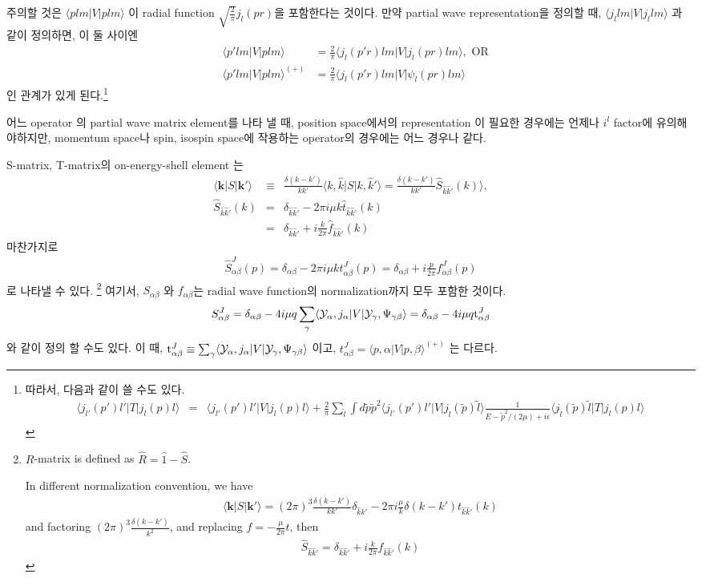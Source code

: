 \documentclass[10pt]{book}
\def\bm{\boldsymbol}
\newcommand{\bea}{\begin{eqnarray}}
\newcommand{\eea}{\end{eqnarray}}
\newcommand{\no}{\nonumber \\}
\def\vk{{\bm k}}
\def\la{\langle}
\def\ra{\rangle}
\begin{document}
\begin{itemize}
주의할 것은 $\la plm|V|plm\ra$ 이 radial function
$\sqrt{\frac{2}{\pi}}j_l(pr)$을 포함한다는 것이다. 만약 partial
wave representation을 정의할 때, $\la j_l lm|V|j_l lm\ra$
과 같이 정의하면, 이 둘 사이엔
\bea
&\la p'lm|V|plm\ra &=\frac{2}{\pi}\la j_l(p'r) lm|V|j_l(pr) lm\ra,\mbox{ OR}\no
&\la p'lm|V|plm\ra^{(+)} &=\frac{2}{\pi}\la j_l(p'r) lm|V|\psi_l(pr) lm\ra
\eea 
인 관계가 있게 된다.\footnote{
따라서, 다음과 같이 쓸 수도 있다.
\bea
\la j_{l'}(p') l'| T| j_{l}(p) l\ra
&=&\la j_{l'}(p') l'| V| j_{l}(p) l\ra
+\frac{2}{\pi}\sum_{\tilde{l}}\int d\tilde{p}\tilde{p}^2
 \la j_{l'}(p') l'| V| j_{\tilde{l}}(\tilde{p}) \tilde{l}\ra
\frac{1}{E-\tilde{p}^2/(2\mu)+i\epsilon}
 \la j_{\tilde{l}}(\tilde{p}) \tilde{l}| T|j_{l}(p) l \ra
\eea
}

어느 operator 의 partial wave matrix element를 나타 낼 때, position space에서의 representation
이 필요한 경우에는 언제나 $i^l$ factor에 유의해야하지만, momentum space나 spin, isospin space에 작용하는  operator의 경우에는 어느 경우나 같다. 

S-matrix, T-matrix의 on-energy-shell element 는 
\bea
\la \vk|S|\vk'\ra& \equiv& 
\frac{\delta(k-k')}{k k'} \la k,\hat{k}|S| k,\hat{k}'\ra
=\frac{\delta(k-k')}{k k'} \hat{S}_{\hat{k}\hat{k}'}(k)\ra,\no
\hat{S}_{\hat{k}\hat{k}'}(k)&=&\delta_{\hat{k}\hat{k}'}
               -2\pi i \mu k \hat{t}_{\hat{k}\hat{k}'}(k)\no
            &=&\delta_{\hat{k}\hat{k}'}
               +i\frac{k}{2\pi}\hat{f}_{\hat{k}\hat{k}'}(k)   
\eea
마찬가지로 
\bea
\hat{S}_{\alpha\beta}^J(p)=
\delta_{\alpha\beta}-2\pi i \mu k t^J_{\alpha\beta}(p)
=\delta_{\alpha\beta}+i\frac{p}{2\pi} f^J_{\alpha\beta}(p)
\eea
로 나타낼 수 있다.
\footnote{
$R$-matrix is defined as $\hat{R}=\hat{1}-\hat{S}$.

In different normalization convention, we have
\bea
\la \vk|S|\vk'\ra
=(2\pi)^3\frac{\delta(k-k')}{k k'}\delta_{\hat{k}\hat{k}'}
-2\pi i\frac{\mu}{k}\delta(k-k') t_{\hat{k}\hat{k}'}(k) 
\eea
and factoring $(2\pi)^3\frac{\delta(k-k')}{k^2}$, 
and replacing $f=-\frac{\mu}{2\pi} t$, then
\bea
\hat{S}_{\hat{k}\hat{k}'}=\delta_{\hat{k}\hat{k}'}
                        +i\frac{k}{2\pi} f_{\hat{k}\hat{k}'}(k)
\eea
}
여기서, $S_{\alpha\beta}$ 와 $f_{\alpha\beta}$는 
radial wave function의 normalization까지 모두 포함한 것이다.
\bea
S^J_{\alpha\beta}=\delta_{\alpha\beta}-4i\mu q\sum_{\gamma}
\la {\cal Y}_\alpha, j_{\alpha}|V|{\cal Y}_{\gamma},\Psi_{\gamma\beta}\ra
=\delta_{\alpha\beta}-4i\mu q {\rm t}^J_{\alpha\beta}
\eea
와 같이 정의 할 수도 있다. 이 때, 
${\rm t}^J_{\alpha\beta}\equiv \sum_{\gamma}
\la {\cal Y}_\alpha, j_{\alpha}|V|{\cal Y}_{\gamma},\Psi_{\gamma\beta}\ra$ 이고,
$t^J_{\alpha\beta}=\la p,\alpha|V|p,\beta\ra^{(+)}$ 는 다르다.

\end{itemize}
\end{document}
